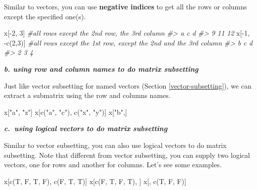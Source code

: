 \documentclass[
]{book}
\newenvironment{Shaded}{\begin{snugshade}}{\end{snugshade}}
\newcommand{\CommentTok}[1]{\textcolor[rgb]{0.56,0.35,0.01}{\textit{#1}}}
\newcommand{\DecValTok}[1]{\textcolor[rgb]{0.00,0.00,0.81}{#1}}
\newcommand{\FunctionTok}[1]{\textcolor[rgb]{0.00,0.00,0.00}{#1}}
\newcommand{\NormalTok}[1]{#1}
\newcommand{\SpecialCharTok}[1]{\textcolor[rgb]{0.00,0.00,0.00}{#1}}
\newcommand{\StringTok}[1]{\textcolor[rgb]{0.31,0.60,0.02}{#1}}
\begin{document}
Similar to vectors, you can use \textbf{negative indices} to get all the rows or columns except the specified one(s).

\begin{Shaded}
\begin{Highlighting}[]
\NormalTok{x[}\SpecialCharTok{{-}}\DecValTok{2}\NormalTok{, }\DecValTok{3}\NormalTok{]       }\CommentTok{\#all rows except the 2nd row, the 3rd column}
\CommentTok{\#\textgreater{}  a  c  d }
\CommentTok{\#\textgreater{}  9 11 12}
\NormalTok{x[}\SpecialCharTok{{-}}\DecValTok{1}\NormalTok{, }\SpecialCharTok{{-}}\FunctionTok{c}\NormalTok{(}\DecValTok{2}\NormalTok{,}\DecValTok{3}\NormalTok{)] }\CommentTok{\#all rows except the 1st row, except the 2nd and the 3rd column}
\CommentTok{\#\textgreater{} b c d }
\CommentTok{\#\textgreater{} 2 3 4}
\end{Highlighting}
\end{Shaded}

\textbf{\emph{b. using row and column names to do matrix subsetting}}

Just like vector subsetting for named vectors (Section \ref{vector-subsetting}), we can extract a submatrix using the row and columns names.

\begin{Shaded}
\begin{Highlighting}[]
\NormalTok{x[}\StringTok{"a"}\NormalTok{, }\StringTok{"z"}\NormalTok{]}
\NormalTok{x[}\FunctionTok{c}\NormalTok{(}\StringTok{"a"}\NormalTok{, }\StringTok{"c"}\NormalTok{), }\FunctionTok{c}\NormalTok{(}\StringTok{"x"}\NormalTok{, }\StringTok{"y"}\NormalTok{)]}
\NormalTok{x[}\StringTok{"b"}\NormalTok{,]}
\end{Highlighting}
\end{Shaded}

\textbf{\emph{c.~using logical vectors to do matrix subsetting}}

Similar to vector subsetting, you can also use logical vectors to do matrix subsetting. Note that different from vector subsetting, you can supply two logical vectors, one for rows and another for columns. Let's see some examples.

\begin{Shaded}
\begin{Highlighting}[]
\NormalTok{x[}\FunctionTok{c}\NormalTok{(T, F, T, F), }\FunctionTok{c}\NormalTok{(F, T, T)]}
\NormalTok{x[}\FunctionTok{c}\NormalTok{(F, T, F, T), ]}
\NormalTok{x[, }\FunctionTok{c}\NormalTok{(T, F, F)]}
\end{Highlighting}
\end{Shaded}
\end{document}
